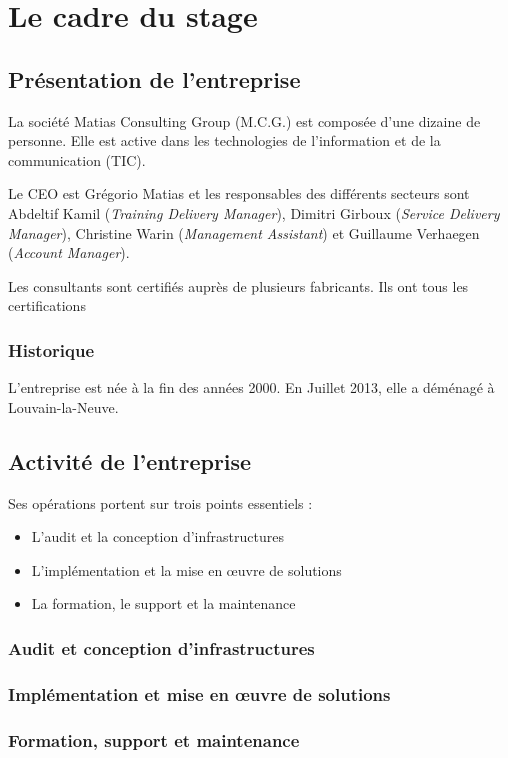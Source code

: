 \chapter{Le cadre du stage}
\section{Présentation de l'entreprise}
La société Matias Consulting Group (M.C.G.) est composée d'une dizaine de personne. 
Elle est active dans les technologies de l'information et de la communication (TIC).

Le CEO est Grégorio Matias et les responsables des différents secteurs sont Abdeltif Kamil (\textit{Training Delivery Manager}), Dimitri Girboux (\textit{Service Delivery Manager}), Christine Warin (\textit{Management Assistant}) et Guillaume Verhaegen (\textit{Account Manager}).

Les consultants sont certifiés auprès de plusieurs fabricants.
Ils ont tous les certifications 
\subsection{Historique}
L'entreprise est née à la fin des années 2000.
En Juillet 2013, elle a déménagé à Louvain-la-Neuve.

\section{Activité de l'entreprise}

Ses opérations portent sur trois points essentiels : 
\begin{itemize}
	\item L'audit et la conception d'infrastructures
	\item L'implémentation et la mise en œuvre de solutions
	\item La formation, le support et la maintenance
\end{itemize}

\subsection{Audit et conception d'infrastructures}

\subsection{Implémentation et mise en œuvre de solutions}

\subsection{Formation, support et maintenance}